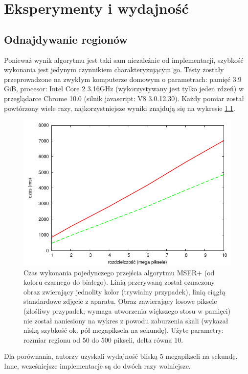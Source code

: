 \chapter{Eksperymenty i wydajność}

\section{Odnajdywanie regionów}

Ponieważ wynik algorytmu jest taki sam niezależnie od implementacji, szybkość
wykonania jest jedynym czynnikiem charakteryzującym go. Testy zostały
przeprowadzone na zwykłym komputerze domowym o parametrach: pamięć 3.9 GiB,
procesor: Intel Core 2 3.16GHz (wykorzystywany jest tylko jeden rdzeń) w
przeglądarce Chrome 10.0 (silnik javascript: V8 3.0.12.30). Każdy pomiar został
powtórzony wiele razy, najkorzystniejsze wyniki znajdują się na wykresie \ref{mser}.

\begin{figure}[h!] \centering \includegraphics{images/mser.pdf} \caption{Czas
  wykonania pojedynczego przejścia algorytmu MSER+ (od koloru czarnego do
  białego). Linią przerywaną został oznaczony obraz zwierający jednolity kolor
  (trywialny przypadek), linią ciągłą standardowe zdjęcie z aparatu. Obraz
  zawierający losowe piksele (złośliwy przypadek; wymaga utworzenia większego
  stosu w pamięci) nie został naniesiony na wykres z powodu zaburzenia skali
  (wykazał niską szybkość ok. pół megapiksela na sekundę). Użyte parametry:
  rozmiar regionu od 50 do 500 pikseli, delta równa 10.} \label{mser}
\end{figure}

Dla porównania, autorzy \cite{Nister_Stewenius_2008} uzyskali wydajność bliską
5 megapikseli na sekundę. Inne, wcześniejsze implementacje są do dwóch razy
wolniejsze.

